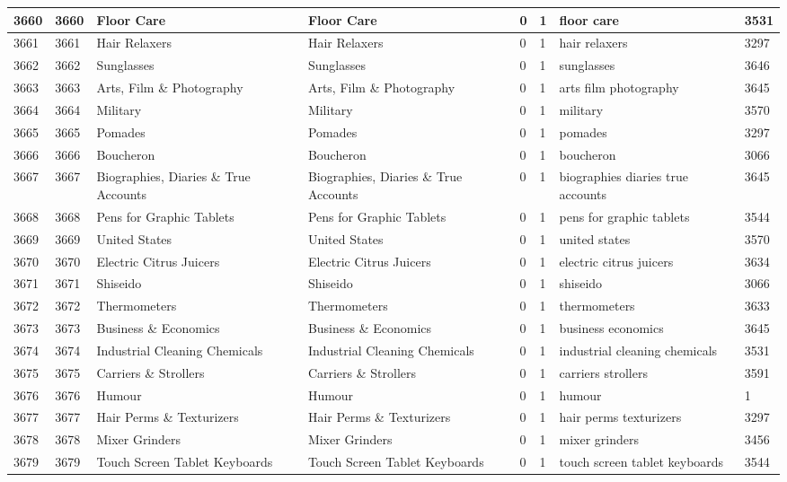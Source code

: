\begin{longtable}{|l|l|l|l|l|l|l|l|}
3660 & 3660 & Floor Care & Floor Care & 0 & 1 & floor care & 3531 \\ \hline 
3661 & 3661 & Hair Relaxers & Hair Relaxers & 0 & 1 & hair relaxers & 3297 \\ \hline 
3662 & 3662 & Sunglasses & Sunglasses & 0 & 1 & sunglasses & 3646 \\ \hline 
3663 & 3663 & Arts, Film \& Photography & Arts, Film \& Photography & 0 & 1 & arts film photography & 3645 \\ \hline 
3664 & 3664 & Military & Military & 0 & 1 & military & 3570 \\ \hline 
3665 & 3665 & Pomades & Pomades & 0 & 1 & pomades & 3297 \\ \hline 
3666 & 3666 & Boucheron & Boucheron & 0 & 1 & boucheron & 3066 \\ \hline 
3667 & 3667 & Biographies, Diaries \& True Accounts & Biographies, Diaries \& True Accounts & 0 & 1 & biographies diaries true accounts & 3645 \\ \hline 
3668 & 3668 & Pens for Graphic Tablets & Pens for Graphic Tablets & 0 & 1 & pens for graphic tablets & 3544 \\ \hline 
3669 & 3669 & United States & United States & 0 & 1 & united states & 3570 \\ \hline 
3670 & 3670 & Electric Citrus Juicers & Electric Citrus Juicers & 0 & 1 & electric citrus juicers & 3634 \\ \hline 
3671 & 3671 & Shiseido & Shiseido & 0 & 1 & shiseido & 3066 \\ \hline 
3672 & 3672 & Thermometers & Thermometers & 0 & 1 & thermometers & 3633 \\ \hline 
3673 & 3673 & Business \& Economics & Business \& Economics & 0 & 1 & business economics & 3645 \\ \hline 
3674 & 3674 & Industrial Cleaning Chemicals & Industrial Cleaning Chemicals & 0 & 1 & industrial cleaning chemicals & 3531 \\ \hline 
3675 & 3675 & Carriers \& Strollers & Carriers \& Strollers & 0 & 1 & carriers strollers & 3591 \\ \hline 
3676 & 3676 & Humour & Humour & 0 & 1 & humour & 1 \\ \hline 
3677 & 3677 & Hair Perms \& Texturizers & Hair Perms \& Texturizers & 0 & 1 & hair perms texturizers & 3297 \\ \hline 
3678 & 3678 & Mixer Grinders & Mixer Grinders & 0 & 1 & mixer grinders & 3456 \\ \hline 
3679 & 3679 & Touch Screen Tablet Keyboards & Touch Screen Tablet Keyboards & 0 & 1 & touch screen tablet keyboards & 3544 \\ \hline 

\end{longtable}
